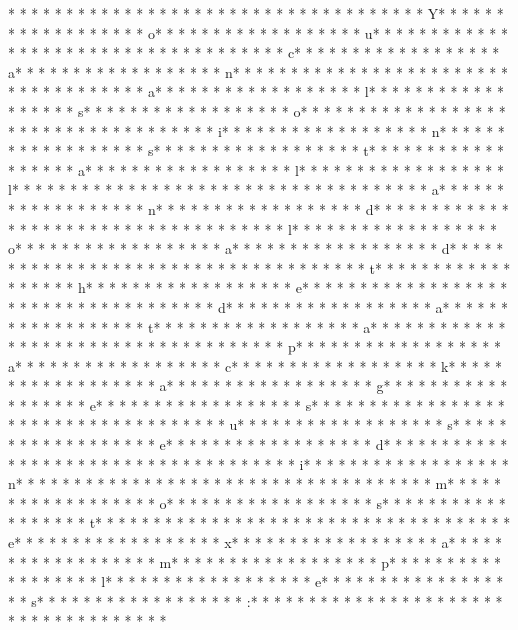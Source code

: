 * * *  * * *  * * *  *  * * *  *  * * *  * 	* * *  * * *  * * *  *  * * *  *  * * *  * Y* * *  * * *  * * *  *  * * *  *  * * *  * o* * *  * * *  * * *  *  * * *  *  * * *  * u* * *  * * *  * * *  *  * * *  *  * * *  *  * * *  * * *  * * *  *  * * *  *  * * *  * c* * *  * * *  * * *  *  * * *  *  * * *  * a* * *  * * *  * * *  *  * * *  *  * * *  * n* * *  * * *  * * *  *  * * *  *  * * *  *  * * *  * * *  * * *  *  * * *  *  * * *  * a* * *  * * *  * * *  *  * * *  *  * * *  * l* * *  * * *  * * *  *  * * *  *  * * *  * s* * *  * * *  * * *  *  * * *  *  * * *  * o* * *  * * *  * * *  *  * * *  *  * * *  *  * * *  * * *  * * *  *  * * *  *  * * *  * i* * *  * * *  * * *  *  * * *  *  * * *  * n* * *  * * *  * * *  *  * * *  *  * * *  * s* * *  * * *  * * *  *  * * *  *  * * *  * t* * *  * * *  * * *  *  * * *  *  * * *  * a* * *  * * *  * * *  *  * * *  *  * * *  * l* * *  * * *  * * *  *  * * *  *  * * *  * l* * *  * * *  * * *  *  * * *  *  * * *  *  * * *  * * *  * * *  *  * * *  *  * * *  * a* * *  * * *  * * *  *  * * *  *  * * *  * n* * *  * * *  * * *  *  * * *  *  * * *  * d* * *  * * *  * * *  *  * * *  *  * * *  *  * * *  * * *  * * *  *  * * *  *  * * *  * l* * *  * * *  * * *  *  * * *  *  * * *  * o* * *  * * *  * * *  *  * * *  *  * * *  * a* * *  * * *  * * *  *  * * *  *  * * *  * d* * *  * * *  * * *  *  * * *  *  * * *  *  * * *  * * *  * * *  *  * * *  *  * * *  * t* * *  * * *  * * *  *  * * *  *  * * *  * h* * *  * * *  * * *  *  * * *  *  * * *  * e* * *  * * *  * * *  *  * * *  *  * * *  *  * * *  * * *  * * *  *  * * *  *  * * *  * d* * *  * * *  * * *  *  * * *  *  * * *  * a* * *  * * *  * * *  *  * * *  *  * * *  * t* * *  * * *  * * *  *  * * *  *  * * *  * a* * *  * * *  * * *  *  * * *  *  * * *  *  * * *  * * *  * * *  *  * * *  *  * * *  * p* * *  * * *  * * *  *  * * *  *  * * *  * a* * *  * * *  * * *  *  * * *  *  * * *  * c* * *  * * *  * * *  *  * * *  *  * * *  * k* * *  * * *  * * *  *  * * *  *  * * *  * a* * *  * * *  * * *  *  * * *  *  * * *  * g* * *  * * *  * * *  *  * * *  *  * * *  * e* * *  * * *  * * *  *  * * *  *  * * *  * s* * *  * * *  * * *  *  * * *  *  * * *  *  * * *  * * *  * * *  *  * * *  *  * * *  * u* * *  * * *  * * *  *  * * *  *  * * *  * s* * *  * * *  * * *  *  * * *  *  * * *  * e* * *  * * *  * * *  *  * * *  *  * * *  * d* * *  * * *  * * *  *  * * *  *  * * *  *  * * *  * * *  * * *  *  * * *  *  * * *  * i* * *  * * *  * * *  *  * * *  *  * * *  * n* * *  * * *  * * *  *  * * *  *  * * *  *  * * *  * * *  * * *  *  * * *  *  * * *  * m* * *  * * *  * * *  *  * * *  *  * * *  * o* * *  * * *  * * *  *  * * *  *  * * *  * s* * *  * * *  * * *  *  * * *  *  * * *  * t* * *  * * *  * * *  *  * * *  *  * * *  *  * * *  * * *  * * *  *  * * *  *  * * *  * e* * *  * * *  * * *  *  * * *  *  * * *  * x* * *  * * *  * * *  *  * * *  *  * * *  * a* * *  * * *  * * *  *  * * *  *  * * *  * m* * *  * * *  * * *  *  * * *  *  * * *  * p* * *  * * *  * * *  *  * * *  *  * * *  * l* * *  * * *  * * *  *  * * *  *  * * *  * e* * *  * * *  * * *  *  * * *  *  * * *  * s* * *  * * *  * * *  *  * * *  *  * * *  * :* * *  * * *  * * *  *  * * *  *  * * *  *  * * *  * * *  * * *  *  * * *  *  * * *  * 
